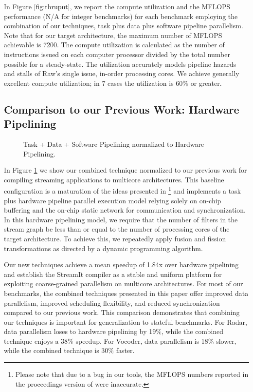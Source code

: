 In Figure \ref{fig:thruput}, we report the compute utilization and the
MFLOPS performance (N/A for integer benchmarks) for each benchmark
employing the combination of our techniques, task plus data plus
software pipeline parallelism. Note that for our target architecture,
the maximum number of MFLOPS achievable is 7200.  The compute
utilization is calculated as the number of instructions issued on each
computer processor divided by the total number possible for a
steady-state.  The utilization accurately models pipeline hazards and
stalls of Raw's single issue, in-order processing cores.  We achieve
generally excellent compute utilization; in 7 cases the utilization is
60\% or greater.


\subsection{Comparison to our Previous Work: Hardware Pipelining}

\begin{figure}[t]
\centering
{}
\caption{Task + Data + Software Pipelining normalized to Hardware Pipelining.
\protect\label{fig:vs-space}}
\vspace{-6pt}
\end{figure}

In Figure \ref{fig:vs-space} we show our combined technique normalized
to our previous work for compiling streaming applications to multicore
architectures.  This baseline configuration is a maturation of the
ideas presented in \cite{streamit-asplos}\footnote{Please note that
due to a bug in our tools, the MFLOPS numbers reported in the
proceedings version of \cite{streamit-asplos} were inaccurate.} and
implements a task plus hardware pipeline parallel execution model
relying solely on on-chip buffering and the on-chip static network for
communication and synchronization. In this hardware pipelining model,
we require that the number of filters in the stream graph be less than
or equal to the number of processing cores of the target architecture.
To achieve this, we repeatedly apply fusion and fission
transformations as directed by a dynamic programming algorithm.

Our new techniques achieve a mean speedup of 1.84x over hardware
pipelining and establish the StreamIt compiler as a stable and uniform
platform for exploiting coarse-grained parallelism on multicore
architectures. For most of our benchmarks, the combined techniques
presented in this paper offer improved data parallelism, improved
scheduling flexibility, and reduced synchronization compared to our
previous work. This comparison demonstrates that combining our
techniques is important for generalization to stateful benchmarks.
For Radar, data parallelism loses to hardware pipelining by 19\%,
while the combined technique enjoys a 38\% speedup. For Vocoder, data
parallelism is 18\% slower, while the combined technique is 30\%
faster.

